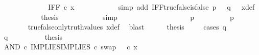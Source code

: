 \begin{isabellebody}
\ \ \ \ \ \ \ \ \isamarkupfalse%
\ \isamarkupfalse%
\ {\isachardoublequoteopen}{\isachardot}{\kern0pt}{\isachardot}{\kern0pt}{\isachardot}{\kern0pt}\ {\isacharequal}{\kern0pt}\ IFF\ {\isasymcirc}\isactrlsub c\ x{\isachardoublequoteclose}\isanewline
\ \ \ \ \ \ \ \ \ \ \isamarkupfalse%
\ {\isacharparenleft}{\kern0pt}simp\ add{\isacharcolon}{\kern0pt}\ IFF{\isacharunderscore}{\kern0pt}true{\isacharunderscore}{\kern0pt}false{\isacharunderscore}{\kern0pt}is{\isacharunderscore}{\kern0pt}false\ {\isacartoucheopen}p\ {\isacharequal}{\kern0pt}\ {\isasymt}{\isacartoucheclose}\ {\isacartoucheopen}q\ {\isacharequal}{\kern0pt}\ {\isasymf}{\isacartoucheclose}\ x{\isacharunderscore}{\kern0pt}def{\isacharparenright}{\kern0pt}\isanewline
\ \ \ \ \ \ \ \ \isamarkupfalse%
\ \isamarkupfalse%
\ {\isacharquery}{\kern0pt}thesis\isanewline
\ \ \ \ \ \ \ \ \ \ \isamarkupfalse%
\ simp\isanewline
\ \ \ \ \ \ \isamarkupfalse%
\isanewline
\ \ \ \ \isamarkupfalse%
\isanewline
\ \ \isamarkupfalse%
\isanewline
\ \ \ \ \isamarkupfalse%
\ {\isachardoublequoteopen}p\ {\isasymnoteq}\ {\isasymt}{\isachardoublequoteclose}\isanewline
\ \ \ \ \isamarkupfalse%
\ \isamarkupfalse%
\ {\isachardoublequoteopen}p\ {\isacharequal}{\kern0pt}\ {\isasymf}{\isachardoublequoteclose}\isanewline
\ \ \ \ \ \ \isamarkupfalse%
\ true{\isacharunderscore}{\kern0pt}false{\isacharunderscore}{\kern0pt}only{\isacharunderscore}{\kern0pt}truth{\isacharunderscore}{\kern0pt}values\ x{\isacharunderscore}{\kern0pt}def\ \isamarkupfalse%
\ blast\isanewline
\ \ \ \ \isamarkupfalse%
\ {\isacharquery}{\kern0pt}thesis\isanewline
\ \ \ \ \isamarkupfalse%
{\isacharparenleft}{\kern0pt}cases\ {\isachardoublequoteopen}q\ {\isacharequal}{\kern0pt}\ {\isasymt}{\isachardoublequoteclose}{\isacharparenright}{\kern0pt}\isanewline
\ \ \ \ \ \ \isamarkupfalse%
\ {\isachardoublequoteopen}q\ {\isacharequal}{\kern0pt}\ {\isasymt}{\isachardoublequoteclose}\isanewline
\ \ \ \ \ \ \isamarkupfalse%
\ {\isacharquery}{\kern0pt}thesis\isanewline
\ \ \ \ \ \ \isamarkupfalse%
\ {\isacharminus}{\kern0pt}\ \isanewline
\ \ \ \ \ \ \ \ \isamarkupfalse%
\ {\isachardoublequoteopen}{\isacharparenleft}{\kern0pt}AND\ {\isasymcirc}\isactrlsub c\ {\isasymlangle}IMPLIES{\isacharcomma}{\kern0pt}IMPLIES\ {\isasymcirc}\isactrlsub c\ swap\ {\isasymOmega}\ {\isasymOmega}{\isasymrangle}{\isacharparenright}{\kern0pt}\ {\isasymcirc}\isactrlsub c\ x\ {\isacharequal}{\kern0pt}\ \ \ \ \isanewline

\end{isabellebody}
